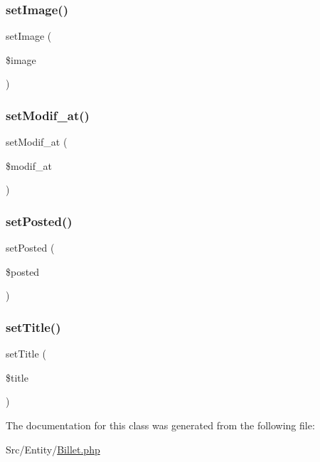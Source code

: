 \subsubsection{\texorpdfstring{set\+Image()}{setImage()}}
{\footnotesize\ttfamily set\+Image (\begin{DoxyParamCaption}\item[{}]{\$image }\end{DoxyParamCaption})}

\mbox{\label{class_src_1_1_entity_1_1_billet_a9f9f5983de6ae197176a80f55f113a6c}} 
\subsubsection{\texorpdfstring{set\+Modif\+\_\+at()}{setModif\_at()}}
{\footnotesize\ttfamily set\+Modif\+\_\+at (\begin{DoxyParamCaption}\item[{Date\+Time}]{\$modif\+\_\+at }\end{DoxyParamCaption})}

\mbox{\label{class_src_1_1_entity_1_1_billet_acee4aedcde0f95ac298a1a0ce86be082}} 
\subsubsection{\texorpdfstring{set\+Posted()}{setPosted()}}
{\footnotesize\ttfamily set\+Posted (\begin{DoxyParamCaption}\item[{}]{\$posted }\end{DoxyParamCaption})}

\mbox{\label{class_src_1_1_entity_1_1_billet_a884ba9bb0d54bde7839e798db7964476}} 
\subsubsection{\texorpdfstring{set\+Title()}{setTitle()}}
{\footnotesize\ttfamily set\+Title (\begin{DoxyParamCaption}\item[{}]{\$title }\end{DoxyParamCaption})}



The documentation for this class was generated from the following file\+:\begin{DoxyCompactItemize}
\item 
Src/\+Entity/\hyperlink{_billet_8php}{Billet.\+php}\end{DoxyCompactItemize}
